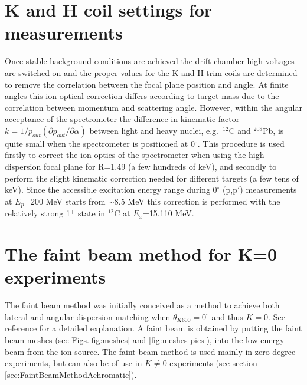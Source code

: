 \documentclass[11pt]{report}
\begin{document}
\clearpage


\section{K and H coil settings for measurements}\label{sec:khcoil0degr}

Once stable background conditions are achieved the drift chamber high voltages are switched on 
and the proper values for the K and H trim coils are determined to 
remove the correlation between the focal plane position and angle.
%
At finite angles this ion-optical correction differs according to target mass
due to the correlation between momentum and scattering angle.
%
However, 
within the angular acceptance of the spectrometer %
the difference in kinematic factor $k = 1/p_{out}(\partial p_{out}/ \partial \alpha)$
between light and heavy nuclei, e.g.~$^{12}$C and $^{208}$Pb,
is quite small when the spectrometer is positioned at 0$^{\circ}$.
%
This procedure is used firstly to correct the ion optics of the spectrometer when using the 
high dispersion focal plane for R=1.49 (a few hundreds of keV), 
and secondly to perform the slight kinematic correction needed for different targets (a few tens of keV).
%
Since the accessible excitation energy range during  0$^{\circ}$ (p,p$'$) measurements at $E_p$=200 MeV 
starts from $\sim$8.5 MeV this correction is performed with the relatively strong 1$^+$ state in $^{12}$C  
at $E_x$=15.110 MeV.





\clearpage

\section{The faint beam method for K=0 experiments}\label{sec:FaintBeamMethod}

The faint beam method was initially conceived as a method to achieve
both lateral and angular dispersion matching when
$\theta_{K600}=0^{\circ}$ and thus $K=0$.
See reference \cite{Fuj02} for a detailed explanation.
A faint beam is obtained by putting the faint beam meshes (see Figs.\ref{fig:meshes} and 
\ref{fig:meshes-pics}),
into the low energy beam from the ion source. 
The faint beam method is used mainly in zero degree experiments, 
but can also be of use in $K\neq0$ experiments (see section \ref{sec:FaintBeamMethodAchromatic}).
\end{document}
